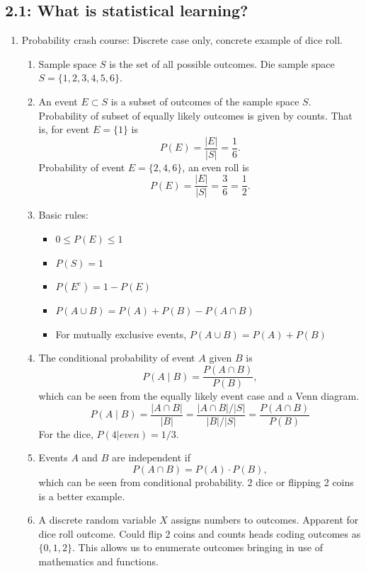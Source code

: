 \documentclass{article}
\begin{document}
\subsection*{2.1: What is statistical learning?}

\begin{enumerate}
\item Probability crash course: Discrete case only, concrete example of dice roll.

\begin{enumerate}
\item Sample space $S$ is the set of all possible outcomes. Die sample space $S=\{1,2,3,4,5,6\}$. 

\item An event $E \subset S$ is a subset of outcomes of the sample space $S$. Probability of subset of equally likely outcomes is given by counts. That is, for event $E=\{1\}$ is
\[
P(E)= \frac{|E|}{|S|} = \frac{1}{6}.
\]
Probability of event $E=\{2,4,6\}$, an even roll is
\[
P(E)= \frac{|E|}{|S|} = \frac{3}{6} = \frac{1}{2}.
\]

\item Basic rules:
\begin{itemize}
\item $0 \leq P(E) \leq 1$
\item $P(S)=1$
\item $P(E^c) = 1-P(E)$
\item $P(A \cup B) = P(A)+P(B)-P(A \cap B)$
\item For mutually exclusive events, $P(A \cup B) = P(A)+P(B)$
\end{itemize}

\item The conditional probability of event $A$ given $B$ is
\[
P(A \mid B) = \frac{P(A \cap B)}{P(B)},
\]
which can be seen from the equally likely event case and a Venn diagram.
\[
P(A \mid B) = \frac{|A \cap B|}{|B|}  = \frac{|A \cap B|/|S|}{|B|/|S|}  = \frac{P(A \cap B)}{P(B)}
\]
For the dice, $P(4|even) = 1/3$.

\item Events $A$ and $B$ are independent if
\[
P(A \cap B) = P(A) \cdot P(B),
\]
which can be seen from conditional probability. 2 dice or flipping 2 coins is a better example.

\item A discrete random variable $X$ assigns numbers to outcomes. Apparent for dice roll outcome. Could flip 2 coins and counts heads coding outcomes as $\{0,1,2\}$. This allows us to enumerate outcomes bringing in use of mathematics and functions.


\end{enumerate}
\end{enumerate}
\end{document}
